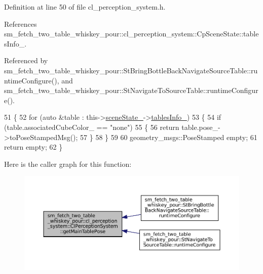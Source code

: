 Definition at line 50 of file cl\+\_\+perception\+\_\+system.\+h.



References sm\+\_\+fetch\+\_\+two\+\_\+table\+\_\+whiskey\+\_\+pour\+::cl\+\_\+perception\+\_\+system\+::\+Cp\+Scene\+State\+::tables\+Info\+\_\+.



Referenced by sm\+\_\+fetch\+\_\+two\+\_\+table\+\_\+whiskey\+\_\+pour\+::\+St\+Bring\+Bottle\+Back\+Navigate\+Source\+Table\+::runtime\+Configure(), and sm\+\_\+fetch\+\_\+two\+\_\+table\+\_\+whiskey\+\_\+pour\+::\+St\+Navigate\+To\+Source\+Table\+::runtime\+Configure().


\begin{DoxyCode}
51             \{
52                 \textcolor{keywordflow}{for} (\textcolor{keyword}{auto} &table : this->\hyperlink{classsm__fetch__two__table__whiskey__pour_1_1cl__perception__system_1_1ClPerceptionSystem_af60dc69df392f4bb2aae7220dd0ff847}{sceneState\_}->\hyperlink{classsm__fetch__two__table__whiskey__pour_1_1cl__perception__system_1_1CpSceneState_a5d6fd3eb480fbb9a241c44ddd42c2930}{tablesInfo\_})
53                 \{
54                     \textcolor{keywordflow}{if} (table.associatedCubeColor\_ == \textcolor{stringliteral}{"none"})
55                     \{
56                         \textcolor{keywordflow}{return} table.pose\_->toPoseStampedMsg();
57                     \}
58                 \}
59 
60                 geometry\_msgs::PoseStamped empty;
61                 \textcolor{keywordflow}{return} empty;
62             \}
\end{DoxyCode}
Here is the caller graph for this function\+:
\nopagebreak
\begin{figure}[H]
\begin{center}
\leavevmode
\includegraphics[width=350pt]{classsm__fetch__two__table__whiskey__pour_1_1cl__perception__system_1_1ClPerceptionSystem_a405a056a25bc0818b3e490eeeeeef98d_icgraph}
\end{center}
\end{figure}
